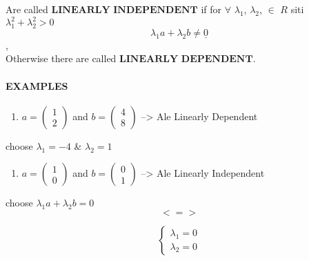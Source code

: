\documentclass[]{article}
\providecommand{\tightlist}{%
  \setlength{\itemsep}{0pt}\setlength{\parskip}{0pt}}
\let\oldparagraph\paragraph
\renewcommand{\paragraph}[1]{\oldparagraph{#1}\mbox{}}
\begin{document}
Are called \(\textbf{LINEARLY INDEPENDENT}\) if for \(\forall\)
\(\lambda_1\), \(\lambda_2\), \(\in\) \(R\) siti
\(\lambda^{2}_1 + \lambda^{2}_2 > 0\)\\
 \[\lambda_1a + \lambda_2b \neq \underline{0}\],\\

Otherwise there are called \(\textbf{LINEARLY DEPENDENT}\).\\

\paragraph{\texorpdfstring{EXAMPLES\\
}{EXAMPLES }}\label{examples}

\begin{enumerate}
\def\labelenumi{\alph{enumi})}
\tightlist
\item
  \(a=\begin{pmatrix} 1\\ 2 \end{pmatrix}\) and
  \(b=\begin{pmatrix} 4\\ 8 \end{pmatrix}\) --\textgreater{} Ale
  Linearly Dependent\\
\end{enumerate}

choose \(\lambda_1 = -4\) \& \(\lambda_2 = 1\)\\

\begin{enumerate}
\def\labelenumi{\alph{enumi})}
\setcounter{enumi}{1}
\tightlist
\item
  \(a=\begin{pmatrix} 1\\ 0 \end{pmatrix}\) and
  \(b=\begin{pmatrix} 0\\ 1 \end{pmatrix}\) --\textgreater{} Ale
  Linearly Independent\\
\end{enumerate}

choose \(\lambda_1a +\lambda_2b= 0\)\\
 \[<=>\]

\[\begin{cases} \lambda_1= 0\\ \lambda_2 = 0 \end{cases}\]\\
\end{document}
